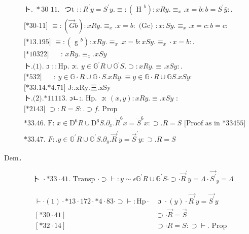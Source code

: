 \documentclass[10pt]{article}
\begin{document}
\begin{align*}
& \text { ト. } * 30 \text { 11. } \text { つt }:: R^{\prime} y=S^{\prime} y . \equiv:\left(\text { H }^{b}\right): x R y . \equiv_{x} . x=b: b=S^{\prime} \bar{y}: . \\
& \text { [*30-11] } \equiv:(\vec{G} b): x R y . \equiv_{x} . x=b: \text { (Gc) }: x: S y . \equiv_{x} . x=c: b=c: \\
& \text { [*13.195] } \equiv:\left(\text { g }^{b}\right): x R y . \equiv_{x} . x=b: x S y . \equiv_{x} \cdot x=b: . \\
& \text { [*10322] } \quad \text { : } x R y . \equiv_{x} . x S y  \tag{1}\\
& \text { ト.(1). ɔ }:: \mathrm{Hp} \text {. ɔ:. } y \in \mathbb{G}^{\prime} R \cup \mathbb{G}^{\prime} S . \supset: x R y . \equiv . x S y: . \\
& \text { [*532] } \quad \text { : } y \in \mathbb{G} \cdot R \cup \mathbb{G} \cdot S . x R y . \equiv y \in \mathbb{G} \cdot R \cup \mathbb{G} S . x S y: \\
& \text { [*33.14.*4.71] J:.xRy.三.xSy }  \tag{2}\\
& \text { ト.(2).*11113. ɔㄴ:. Hp. } \text { ɔ: }(x, y): x R y . \equiv . x S y \text { : } \\
& \text { [*2143] } \supset: R=S: . \supset f \text {. Prop } \\
& \text { *33.46. F: } x \in \mathrm{D}^{6} R \cup \mathrm{D}^{6} S . \partial_{x} . \breve{R}^{6} x=\breve{S}^{6} x: \supset . R=S \text { [Proof as in *33455] } \\
& \text { *33.47. } F: . y \in \mathbb{G}^{\prime} R \cup \mathbb{G}^{\prime} S . \partial_{y} . \vec{R}^{\prime} y=\vec{S}^{\prime} y: \supset . R=S
\end{align*}


Dem．


\begin{equation*}
\text { ト } \cdot * 33 \cdot 41 \text {. Transp } \cdot \supset \vdash: y \sim \epsilon \mathbb{G}^{\prime} R \cup \mathbb{G}^{\prime} S \cdot \supset \cdot \vec{R}^{\prime} y=\Lambda \cdot{\overrightarrow{S^{\prime}}}_{y}=\Lambda \tag{1}
\end{equation*}


$$
\begin{array}{ll}
\vdash \cdot(1) \cdot * 13 \cdot 172 \cdot * 4 \cdot 83 \cdot \supset \vdash: \mathrm{Hp} \cdot & \text { ɔ } \cdot(y) \cdot \overrightarrow{R^{\prime}} y=\overrightarrow{S^{\prime}} y \\
{[* 30 \cdot 41]} & \supset \cdot \vec{R}=\vec{S} \\
{[* 32 \cdot 14]} & \supset \cdot R=S: \supset \vdash . \text { Prop }
\end{array}
$$
\end{document}
